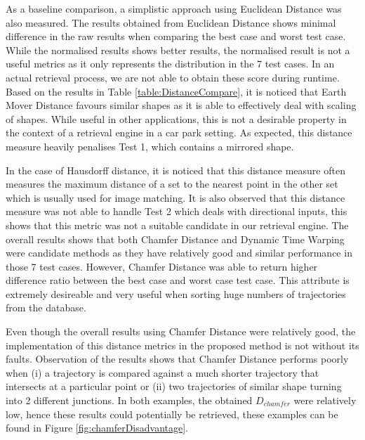 As a baseline comparison, a simplistic approach using Euclidean Distance was
also measured. The results obtained from Euclidean Distance shows minimal
difference in the raw results when comparing the best case and worst test case.
While the normalised results shows better results, the normalised result is not
a useful metrics as it only represents the distribution in the 7 test cases. In
an actual retrieval process, we are not able to obtain these score during
runtime. Based on the results in Table \ref{table:DistanceCompare}, it is
noticed that Earth Mover Distance favours similar shapes as it is able to
effectively deal with scaling of shapes. While useful in other applications,
this is not a desirable property in the context of a retrieval engine in a car
park setting. As expected, this distance measure heavily penalises Test 1, which
contains a mirrored shape.

In the case of Hausdorff distance, it is noticed that this distance measure
often measures the maximum distance of a set to the nearest point in the other
set which is usually used for image matching. It is also observed that this
distance measure was not able to handle Test 2 which deals with directional
inputs, this shows that this metric was not a suitable candidate in our
retrieval engine. The overall results shows that both Chamfer Distance and
Dynamic Time Warping were candidate methods  as they have relatively good and
similar performance in those 7 test cases. However, Chamfer Distance was able
to return higher difference ratio between the best case and worst case test
case. This attribute is extremely desireable and very useful when sorting huge
numbers of trajectories from the database.

Even though the overall results using Chamfer Distance were relatively good,
the implementation of this distance metrics in the proposed method is not
without its faults. Observation of the results shows that Chamfer Distance
performs poorly when (i) a trajectory is compared against a much shorter
trajectory that intersects at a particular point or (ii) two trajectories
of similar shape turning into 2 different junctions. In both examples,
the obtained $D_{chamfer}$ were relatively low, hence these results could
potentially be retrieved, these examples can be found in Figure
\ref{fig:chamferDisadvantage}.

